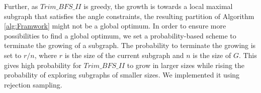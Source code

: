 Further, as $Trim\_BFS\_II$ is greedy, the growth is towards a local maximal subgraph that satisfies the angle constraints, the resulting partition of Algorithm \ref{alg:Framwork} might not be a global optimum. In order to ensure more possibilities to find a global optimum, we set a probability-based scheme to terminate the growing of a subgraph. The probability to terminate the growing is set to $r/n$, where $r$ is the size of the current subgraph and $n$ is the size of $G$. This gives high probability for $Trim\_BFS\_II$ to grow in larger sizes while rising the probability of exploring subgraphs of smaller sizes. We implemented it using rejection sampling.











